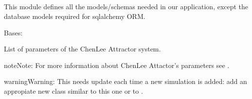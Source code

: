 \documentclass[a4paper,landscape,10pt,english]{sphinxmanual}
\begin{document}
\subparagraph{}
\label{\detokenize{code_docs/simulation_api.controller:module-simulation_api.controller.schemas}}\label{\detokenize{code_docs/simulation_api.controller:simulation-api-controller-schemas}}
This module defines all the models/schemas needed in our application, except
the database models required for sqlalchemy ORM.

\begin{fulllineitems}
\label{\detokenize{code_docs/simulation_api.controller:simulation_api.controller.schemas.ChenLeeParams}}
Bases: 

List of parameters of the Chen\sphinxhyphen{}Lee Attractor system.

\begin{sphinxadmonition}{note}{Note:}
For more information about Chen\sphinxhyphen{}Lee Attactor’s parameters see
{\hyperref[\detokenize{code_docs/simulation_api.simulation:simulation_api.simulation.simulations.ChenLeeAttractor}]{}}.
\end{sphinxadmonition}

\begin{sphinxadmonition}{warning}{Warning:}
This needs update each time a new simulation is added: add an
appropiate new class similar to this one or to
{\hyperref[\detokenize{code_docs/simulation_api.controller:simulation_api.controller.schemas.HOParams}]{}}.
\end{sphinxadmonition}


\end{fulllineitems}
\end{document}
